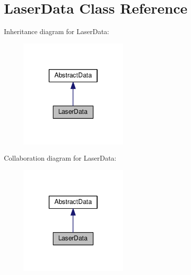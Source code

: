 \hypertarget{classLaserData}{}\section{Laser\+Data Class Reference}
\label{classLaserData}


Inheritance diagram for Laser\+Data\+:\nopagebreak
\begin{figure}[H]
\begin{center}
\leavevmode
\includegraphics[width=154pt]{classLaserData__inherit__graph}
\end{center}
\end{figure}


Collaboration diagram for Laser\+Data\+:\nopagebreak
\begin{figure}[H]
\begin{center}
\leavevmode
\includegraphics[width=154pt]{classLaserData__coll__graph}
\end{center}
\end{figure}
